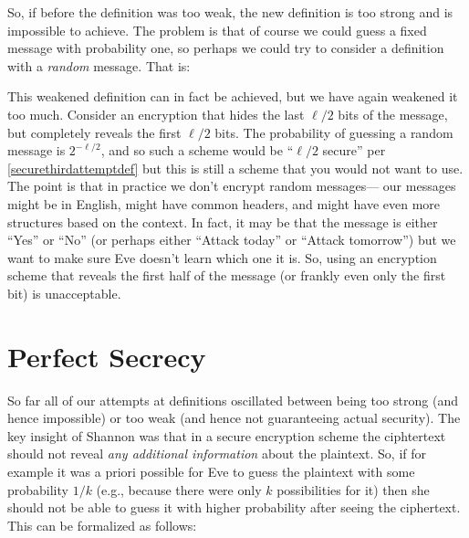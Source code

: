 So, if before the definition was too weak, the new definition is too
strong and is impossible to achieve. The problem is that of course we
could guess a fixed message with probability one, so perhaps we could
try to consider a definition with a \emph{random} message. That is:

\hypertarget{securethirdattemptdef}{}

This weakened definition can in fact be achieved, but we have again
weakened it too much. Consider an encryption that hides the last
\(\ell/2\) bits of the message, but completely reveals the first
\(\ell/2\) bits. The probability of guessing a random message is
\(2^{-\ell/2}\), and so such a scheme would be ``\(\ell/2\) secure'' per
\cref{securethirdattemptdef} but this is still a scheme that you would
not want to use. The point is that in practice we don't encrypt random
messages--- our messages might be in English, might have common headers,
and might have even more structures based on the context. In fact, it
may be that the message is either ``Yes'' or ``No'' (or perhaps either
``Attack today'' or ``Attack tomorrow'') but we want to make sure Eve
doesn't learn which one it is. So, using an encryption scheme that
reveals the first half of the message (or frankly even only the first
bit) is unacceptable.

\section{Perfect Secrecy}\label{Perfect-Secrecy}

So far all of our attempts at definitions oscillated between being too
strong (and hence impossible) or too weak (and hence not guaranteeing
actual security). The key insight of Shannon was that in a secure
encryption scheme the ciphtertext should not reveal \emph{any additional
information} about the plaintext. So, if for example it was a priori
possible for Eve to guess the plaintext with some probability \(1/k\)
(e.g., because there were only \(k\) possibilities for it) then she
should not be able to guess it with higher probability after seeing the
ciphertext. This can be formalized as follows:

